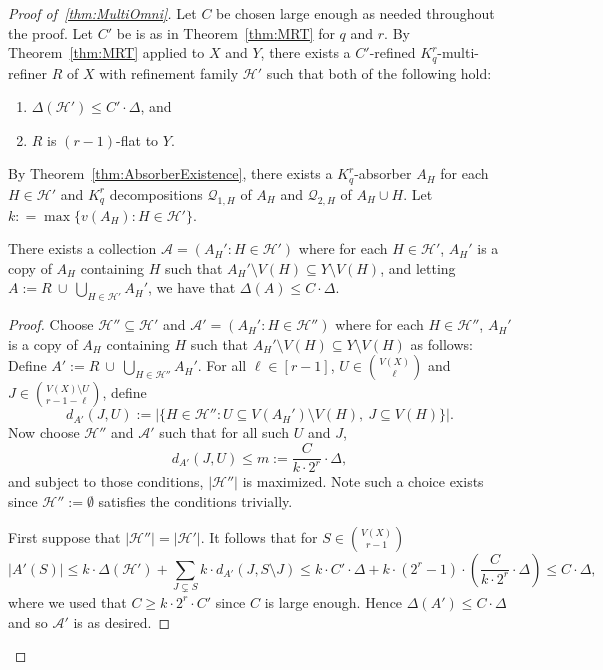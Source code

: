 \documentclass[11pt]{article}
\newcounter{i}
\theoremstyle{plain}
\renewcommand{\theclaim}{\thetheorem.\arabic{claim}}
\newenvironment{lateproof}[1]
 {%
  \renewcommand{\theclaim}{\ref{#1}.\arabic{claim}}%
  \begin{proof}[Proof of~\cref{#1}]%
 }
 {\end{proof}}
\theoremstyle{plain} %
\theoremstyle{definition}
\begin{document}
\begin{lateproof}{thm:MultiOmni}
Let $C$ be chosen large enough as needed throughout the proof. Let $C'$ be is as in Theorem~\ref{thm:MRT} for $q$ and $r$. By Theorem~\ref{thm:MRT} applied to $X$ and $Y$, there exists a $C'$-refined $K_q^r$-multi-refiner $R$ of $X$ with refinement family $\mathcal{H}'$ such that both of the following hold:
\begin{enumerate}
    \item[($1^{\prime}$)] $\Delta(\mathcal{H}') \le C' \cdot \Delta$, and
    \item[($2^{\prime}$)] $R$ is $(r-1)$-flat to $Y$. %
\end{enumerate}

By Theorem~\ref{thm:AbsorberExistence}, there exists a $K_q^r$-absorber $A_H$ for each $H\in \mathcal{H}'$ and $K_q^r$ decompositions $\mathcal{Q}_{1,H}$ of $A_H$ and $\mathcal{Q}_{2,H}$ of $A_H\cup H$. Let $k: = \max\{ v(A_H): H\in \mathcal{H}'\}$. 

\begin{claim}\label{claim:A}
There exists a collection $\mathcal{A}=(A_H': H\in \mathcal{H}')$ where for each $H\in \mathcal{H}'$, $A_H'$ is a copy of $A_H$ containing $H$ such that $A_H'\setminus V(H) \subseteq Y\setminus V(H)$, and letting $A:= R~\cup~ \bigcup_{H\in \mathcal{H}'} A_H'$, we have that $\Delta(A)\le C\cdot \Delta$.    
\end{claim}
\begin{proof}
Choose $\mathcal{H}''\subseteq \mathcal{H}'$ and $\mathcal{A}' = (A_H': H\in \mathcal{H}'')$ where for each $H\in \mathcal{H}''$, $A_H'$ is a copy of $A_H$ containing $H$ such that $A_H'\setminus V(H) \subseteq Y\setminus V(H)$ as follows: Define $A':= R~\cup~ \bigcup_{H\in \mathcal{H}''} A_H'$. For all $\ell\in [r-1]$, $U\in \binom{V(X)}{\ell}$ and $J\in \binom{V(X)\setminus U}{r-1-\ell}$, define 
$$d_{A'}(J,U) := |\{ H\in \mathcal{H}'': U\subseteq V(A_H')\setminus V(H),~J\subseteq V(H)\}|.$$
Now choose $\mathcal{H}''$ and $\mathcal{A}'$ such that for all such $U$ and $J$,
$$d_{A'}(J,U)\le m:=\frac{C}{k\cdot 2^r}\cdot \Delta,$$
and subject to those conditions, $|\mathcal{H}''|$ is maximized. Note such a choice exists since $\mathcal{H}'':=\emptyset$ satisfies the conditions trivially. 

First suppose that $|\mathcal{H}''|=|\mathcal{H}'|$. It follows that for $S\in \binom{V(X)}{r-1}$
$$|A'(S)| \le k\cdot \Delta(\mathcal{H}') + \sum_{J\subsetneq S} k\cdot d_{A'}(J,S\setminus J) \le k\cdot C'\cdot \Delta + k\cdot (2^r-1) \cdot \left(\frac{C}{k\cdot 2^r}\cdot \Delta\right) \le C\cdot \Delta,$$
where we used that $C\ge k\cdot 2^r\cdot C'$ since $C$ is large enough. Hence $\Delta(A')\le C\cdot \Delta$ and so $\mathcal{A}'$ is as desired.


\end{proof}
\end{lateproof}
\end{document}
